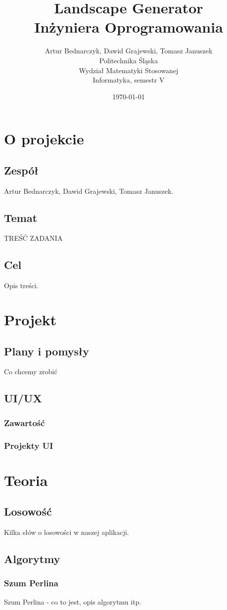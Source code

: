 \documentclass[12pt,a4paper]{article}
\title{Landscape Generator\\Inżyniera Oprogramowania}
\author{Artur Bednarczyk, Dawid Grajewski, Tomasz Januszek\\Politechnika Śląska\\Wydział Matematyki Stosowanej\\Informatyka, semestr V}
\date{\today}
\begin{document}
\maketitle
\newpage
\tableofcontents
\newpage
\section{O projekcie}
\subsection{Zespół}
Artur Bednarczyk, Dawid Grajewski, Tomasz Januszek.
\subsection{Temat}
TREŚĆ ZADANIA
\subsection{Cel}
Opis treści.
\section{Projekt}
\subsection{Plany i pomysły}
Co chcemy zrobić
\subsection{UI/UX}
\subsubsection{Zawartość}
\subsubsection{Projekty UI}
\section{Teoria}
\subsection{Losowość}
Kilka słów o losowości w naszej aplikacji.
\subsection{Algorytmy}
\subsubsection{Szum Perlina}
Szum Perlina - co to jest, opis algorytmu itp.
\end{document}
